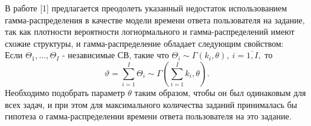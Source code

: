 \documentclass[14pt, a4paper]{extarticle}
\numberwithin{equation}{section}
\begin{document}
{В работе [1] предлагается преодолеть указанный недостаток использованием гамма-распределения в качестве модели времени ответа пользователя на задание, так как плотности вероятности логнормального и гамма-распределений имеют схожие структуры, и гамма-распределение обладает следующим свойством:\\
Если $\Theta_1,\ldots,\Theta_I$ - независимые СВ, такие что $\Theta_i\sim\Gamma(k_i,\theta), \: i=\overline{1,I},$ то $$\vartheta = \underset{i=1}{\overset{I}{\sum}} \Theta_i \sim \Gamma (\underset{i=1}{\overset{I}{\sum}} k_i,\theta).$$
Необходимо подобрать параметр $\theta$ таким образом, чтобы он был одинаковым для всех задач, и при этом для максимального количества заданий принималась бы гипотеза о гамма-распределении времени ответа пользователя на это задание.

}
\end{document}
